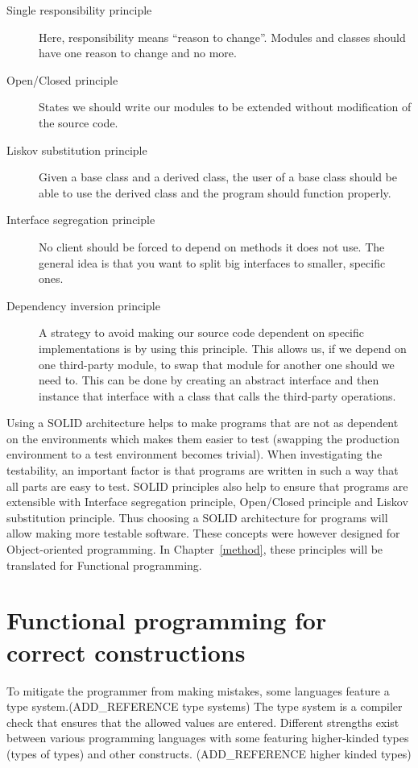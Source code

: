 \begin{description}
    \item [Single responsibility principle] Here, responsibility means ``reason
        to change''. Modules and classes should have one reason to change and no
        more.
    \item [Open/Closed principle] States we should write our modules to be
        extended without modification of the source code.
    \item [Liskov substitution principle] Given a base class and a derived
        class, the user of a base class should be able to use the derived
        class and the program should function properly.
    \item [Interface segregation principle] No client should be forced to depend
        on methods it does not use. The general idea is that you want to split
        big interfaces to smaller, specific ones.
    \item [Dependency inversion principle] A strategy to avoid making our source
        code dependent on specific implementations is by using this principle.
        This allows us, if we depend on one third-party module, to swap that
        module for another one should we need to. This can be done by creating
        an abstract interface and then instance that interface with a class that
        calls the third-party operations.
\end{description}

Using a SOLID architecture helps to make programs that are not as dependent on
the environments which makes them easier to test (swapping the production
environment to a test environment becomes trivial). When investigating the
testability, an important factor is that programs are written in such a way
that all parts are easy to test. SOLID principles also help to ensure that
programs are extensible with Interface segregation principle, Open/Closed
principle and Liskov substitution principle. Thus choosing a SOLID architecture
for programs will allow making more testable software. These concepts were
however designed for Object-oriented programming. In Chapter~\ref{method},
these principles will be translated for Functional programming. 

\section{Functional programming for correct constructions}

To mitigate the programmer from making mistakes, some languages feature a type
system.(ADD\_REFERENCE type systems) The type system is a compiler check that
ensures that the allowed values are entered. Different strengths exist between
various programming languages with some featuring higher-kinded types (types of
types) and other constructs.  (ADD\_REFERENCE higher kinded types)

